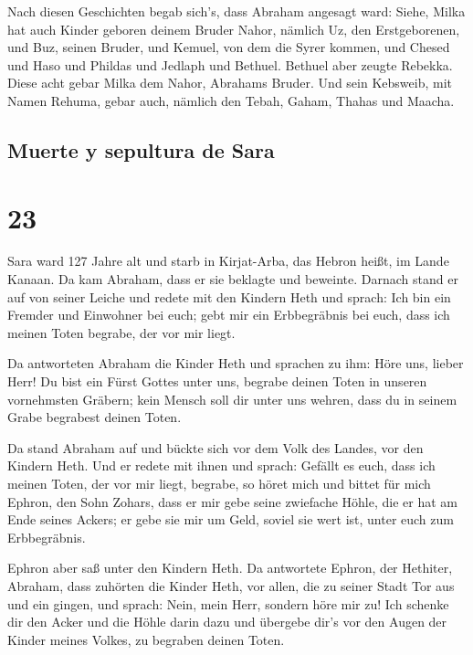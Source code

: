  Nach diesen Geschichten begab sich's, dass Abraham
angesagt ward: Siehe, Milka hat auch Kinder geboren deinem Bruder Nahor,
 nämlich Uz, den Erstgeborenen, und Buz, seinen Bruder,
und Kemuel, von dem die Syrer kommen,  und Chesed und
Haso und Phildas und Jedlaph und Bethuel.  Bethuel aber
zeugte Rebekka. Diese acht gebar Milka dem Nahor, Abrahams Bruder.
 Und sein Kebsweib, mit Namen Rehuma, gebar auch, nämlich
den Tebah, Gaham, Thahas und Maacha.

\hypertarget{muerte-y-sepultura-de-sara}{%
\subsection{Muerte y sepultura de
Sara}\label{muerte-y-sepultura-de-sara}}

\hypertarget{section-22}{%
\section{23}\label{section-22}}

 Sara ward 127 Jahre alt  und starb in
Kirjat-Arba, das Hebron heißt, im Lande Kanaan. Da kam Abraham, dass er
sie beklagte und beweinte.  Darnach stand er auf von
seiner Leiche und redete mit den Kindern Heth und sprach: 
Ich bin ein Fremder und Einwohner bei euch; gebt mir ein Erbbegräbnis
bei euch, dass ich meinen Toten begrabe, der vor mir liegt.

 Da antworteten Abraham die Kinder Heth und sprachen zu
ihm:  Höre uns, lieber Herr! Du bist ein Fürst Gottes
unter uns, begrabe deinen Toten in unseren vornehmsten Gräbern; kein
Mensch soll dir unter uns wehren, dass du in seinem Grabe begrabest
deinen Toten.

 Da stand Abraham auf und bückte sich vor dem Volk des
Landes, vor den Kindern Heth.  Und er redete mit ihnen und
sprach: Gefällt es euch, dass ich meinen Toten, der vor mir liegt,
begrabe, so höret mich und bittet für mich Ephron, den Sohn Zohars,
 dass er mir gebe seine zwiefache Höhle, die er hat am
Ende seines Ackers; er gebe sie mir um Geld, soviel sie wert ist, unter
euch zum Erbbegräbnis.

 Ephron aber saß unter den Kindern Heth. Da antwortete
Ephron, der Hethiter, Abraham, dass zuhörten die Kinder Heth, vor allen,
die zu seiner Stadt Tor aus und ein gingen, und sprach: 
Nein, mein Herr, sondern höre mir zu! Ich schenke dir den Acker und die
Höhle darin dazu und übergebe dir's vor den Augen der Kinder meines
Volkes, zu begraben deinen Toten.

